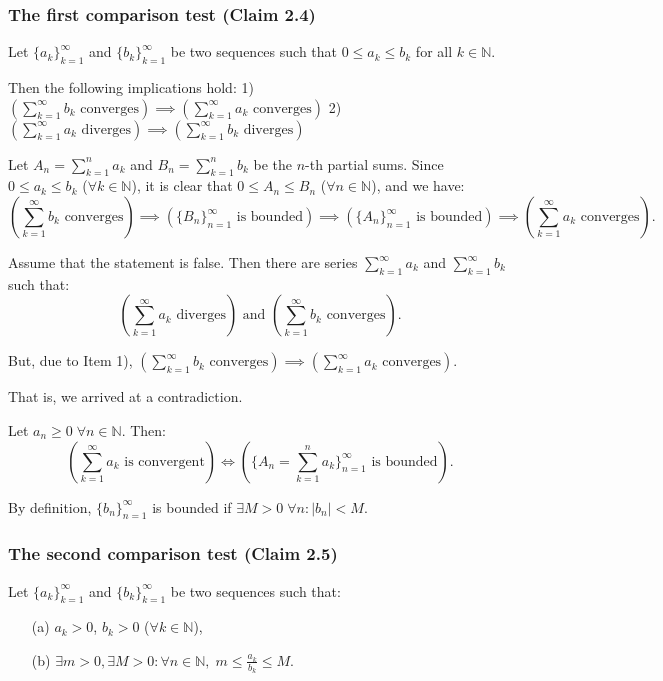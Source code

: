 \subsubsection{The first comparison test (Claim 2.4)}
Let $\{a_k\}_{k=1}^\infty$ and $\{b_k\}_{k=1}^\infty$ be two sequences such that $0 \leq a_k \leq b_k$ for all $k \in \mathbb{N}$.

Then the following implications hold:
1) $\left( \sum_{k=1}^\infty b_k \text{ converges} \right) \implies \left( \sum_{k=1}^\infty a_k \text{ converges} \right)$
2) $\left( \sum_{k=1}^\infty a_k \text{ diverges} \right) \implies \left( \sum_{k=1}^\infty b_k \text{ diverges} \right)$

Let $A_n = \sum_{k=1}^n a_k$ and $B_n = \sum_{k=1}^n b_k$ be the $n$-th partial sums. Since $0 \leq a_k \leq b_k$ ($\forall k \in \mathbb{N}$), it is clear that $0 \leq A_n \leq B_n$ ($\forall n \in \mathbb{N}$), and we have:
\[
\left( \sum_{k=1}^\infty b_k \text{ converges} \right) \implies \left( \{B_n\}_{n=1}^\infty \text{ is bounded} \right) \implies \left( \{A_n\}_{n=1}^\infty \text{ is bounded} \right) \implies \left( \sum_{k=1}^\infty a_k \text{ converges} \right).
\]

Assume that the statement is false. Then there are series $\sum_{k=1}^\infty a_k$ and $\sum_{k=1}^\infty b_k$ such that:
\[
\left( \sum_{k=1}^\infty a_k \text{ diverges} \right) \text{ and } \left( \sum_{k=1}^\infty b_k \text{ converges} \right).
\]

But, due to Item 1), $\left( \sum_{k=1}^\infty b_k \text{ converges} \right) \implies \left( \sum_{k=1}^\infty a_k \text{ converges} \right)$.

That is, we arrived at a contradiction.

Let $a_n \geq 0 \; \forall n \in \mathbb{N}$. Then:
\[
\left( \sum_{k=1}^\infty a_k \text{ is convergent} \right) \iff \left( \{A_n = \sum_{k=1}^n a_k\}_{n=1}^\infty \text{ is bounded} \right).
\]

By definition, $\{b_n\}_{n=1}^\infty$ is bounded if $\exists M > 0 \; \forall n : |b_n| < M$.

\subsubsection{The second comparison test (Claim 2.5)}
Let $\{a_k\}_{k=1}^\infty$ and $\{b_k\}_{k=1}^\infty$ be two sequences such that:
\begin{itemize}
    \item[(a)] $a_k > 0$, $b_k > 0$ \quad ($\forall k \in \mathbb{N}$),
    \item[(b)] $\exists m > 0, \exists M > 0 : \forall n \in \mathbb{N}, \; m \leq \frac{a_k}{b_k} \leq M$.
\end{itemize}

